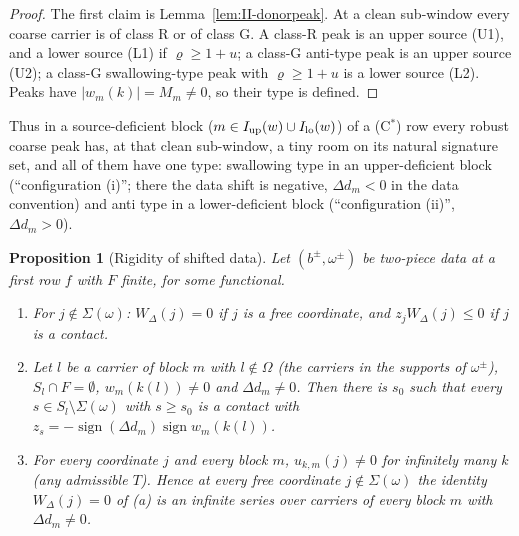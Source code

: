 \documentclass[10pt]{amsart}
\newtheorem{proposition}[theorem]{Proposition}
\theoremstyle{definition}
\theoremstyle{remark}
\newcommand{\sgn}{\operatorname{sign}}
\begin{document}
\begin{proof}
The first claim is Lemma~\ref{lem:II-donorpeak}.  At a clean sub-window every coarse
carrier is of class R or of class G.  A class-R peak is an upper source
(U1), and a lower source (L1) if $\varrho\ge1+u$; a class-G anti-type peak is
an upper source (U2); a class-G swallowing-type peak with $\varrho\ge1+u$ is a
lower source (L2).  Peaks have $|w_m(k)|=M_m\ne0$, so their type is defined.
\end{proof}

Thus in a source-deficient block ($m\in I_{\rm up}(w)\cup I_{\rm lo}(w)$)
of a (C$^*$) row every robust coarse peak has, at that clean sub-window, a
tiny room on its natural signature set,
and all of them have one type: swallowing type in an upper-deficient block
(``configuration (i)''; there the data shift is negative, $\Delta d_m<0$ in
the data convention) and anti type in a lower-deficient block
(``configuration (ii)'', $\Delta d_m>0$).

\begin{proposition}[Rigidity of shifted data]\label{prop:II-C3}
Let $(b^\pm,\omega^\pm)$ be two-piece data at a first row $f$ with $F$
finite, for some functional.
\begin{enumerate}
\item[(a)] For $j\notin\Sigma(\omega)$: $W_\Delta(j)=0$ if $j$ is a free
coordinate, and $z_jW_\Delta(j)\le0$ if $j$ is a contact.
\item[(b)] Let $l$ be a carrier of block $m$ with $l\notin\Omega$ \textup{(}the
carriers in the supports of $\omega^\pm$\textup{)}, $S_l\cap F=\emptyset$,
$w_m(k(l))\ne0$ and $\Delta d_m\ne0$.  Then there is $s_0$ such that every
$s\in S_l\setminus\Sigma(\omega)$ with $s\ge s_0$ is a contact with
$z_s=-\sgn(\Delta d_m)\sgn w_m(k(l))$.
\item[(c)] For every coordinate $j$ and every block $m$, $u_{k,m}(j)\ne0$ for
infinitely many $k$ \textup{(}any admissible $T$\textup{)}.  Hence at every free
coordinate $j\notin\Sigma(\omega)$ the identity $W_\Delta(j)=0$ of \textup{(a)}
is an infinite series over carriers of every block $m$ with $\Delta d_m\ne0$.
\end{enumerate}
\end{proposition}
\end{document}
